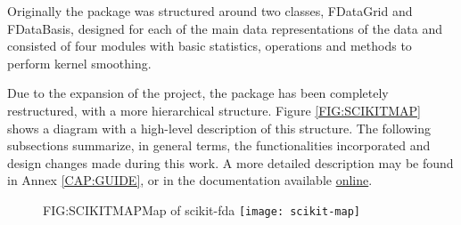 
Originally the package was structured around two classes, FDataGrid and
FDataBasis, designed for each of the main data representations of the data and
consisted of four modules with basic statistics, operations and methods to
perform kernel smoothing.

Due to the expansion of the project, the package has been completely
restructured, with a more hierarchical structure. Figure \ref{FIG:SCIKITMAP}
shows a diagram with a high-level description of this structure. The following
subsections summarize, in general terms, the functionalities incorporated and
design changes made during this work. A more detailed description may be found
in Annex \ref{CAP:GUIDE}, or in the documentation available \href{https://fda.readthedocs.io/en/latest/}{online}.

\begin{figure}[Map of scikit-fda]{FIG:SCIKITMAP}{Map of scikit-fda \cite{scikitfda}}
  \texttt{[image: scikit-map]}
\end{figure}
